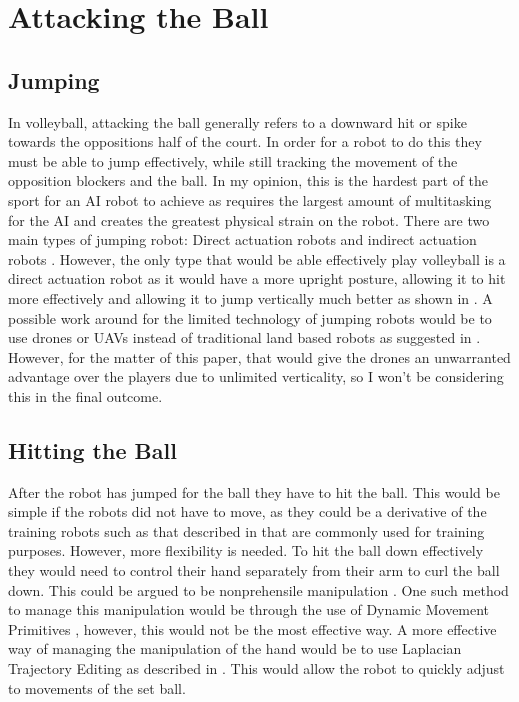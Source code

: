 \documentclass{scrartcl}
\begin{document}
\section{Attacking the Ball}
\subsection{Jumping}
In volleyball, attacking the ball generally refers to a downward hit or spike towards the oppositions half of the court. In order for a robot to do this they must be able to jump effectively, while still tracking the movement of the opposition blockers and the ball. In my opinion, this is the hardest part of the sport for an AI robot to achieve as requires the largest amount of multitasking for the AI and creates the greatest physical strain on the robot. There are two main types of jumping robot: Direct actuation robots and indirect actuation robots \cite{zhang2016review}. However, the only type that would be able effectively play volleyball is a direct actuation robot as it would have a more upright posture, allowing it to hit more effectively and allowing it to jump vertically much better as shown in \cite{zhang2016review}. A possible work around for the limited technology of jumping robots would be to use drones or UAVs instead of traditional land based robots as suggested in \cite{shoval2016volleybot}. However, for the matter of this paper, that would give the drones an unwarranted advantage over the players due to unlimited verticality, so I won't be considering this in the final outcome.
\subsection{Hitting the Ball}
After the robot has jumped for the ball they have to hit the ball. This would be simple if the robots did not have to move, as they could be a derivative of the training robots such as that described in \cite{li2007development} that are commonly used for training purposes. However, more flexibility is needed. To hit the ball down effectively they would need to control their hand separately from their arm to curl the ball down. This could be argued to be nonprehensile manipulation \cite{pekarovskiy2015online}. One such method to manage this manipulation would be through the use of Dynamic Movement Primitives \cite{ijspeert2002movement}, however, this would not be the most effective way. A more effective way of managing the manipulation of the hand would be to use Laplacian Trajectory Editing as described in \cite{nierhoff2012fast}. This would allow the robot to quickly adjust to movements of the set ball.
\end{document}

